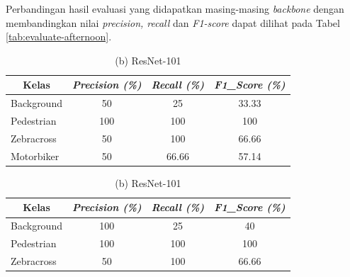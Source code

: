 Perbandingan hasil evaluasi yang didapatkan masing-masing \textit{backbone} dengan membandingkan nilai \textit{precision, recall} dan \textit{F1-score} dapat dilihat pada Tabel \ref{tab:evaluate-afternoon}.

\begin{table}[!h]
	\centering
	\caption{{Perbandingan Hasil Evaluasi pada Siang Hari}}
	\begin{minipage}[b]{\textwidth}
		\centering
		\caption*{(a) ResNet-50}
		\begin{tabular}{|l|c|c|c|}
			\hline
			\multicolumn{1}{|c|}{\textbf{Kelas}} & \textit{\textbf{Precision (\%)}} & \textit{\textbf{Recall (\%)}} & \textit{\textbf{F1\_Score (\%)}} \\ \hline
			Background                           & 50                               & 25                            & 33.33                            \\ \hline
			Pedestrian                           & 100                              & 100                           & 100                              \\ \hline
			Zebracross                           & 50                               & 100                           & 66.66                            \\ \hline
			Motorbiker                           & 50                               & 66.66                         & 57.14                            \\ \hline
		\end{tabular}
	\end{minipage}
	\vfill
	\begin{minipage}[b]{\textwidth}
		\centering
		\caption*{(b) ResNet-101}
		\begin{tabular}{|l|c|c|c|}
			\hline
			\multicolumn{1}{|c|}{\textbf{Kelas}} & \textit{\textbf{Precision (\%)}} & \textit{\textbf{Recall (\%)}} & \textit{\textbf{F1\_Score (\%)}} \\ \hline
			Background                           & 100                              & 25                            & 40                               \\ \hline
			Pedestrian                           & 100                              & 100                           & 100                              \\ \hline
			Zebracross                           & 50                               & 100                           & 66.66                            \\ \hline

\end{tabular}
\end{minipage}
\end{table}
